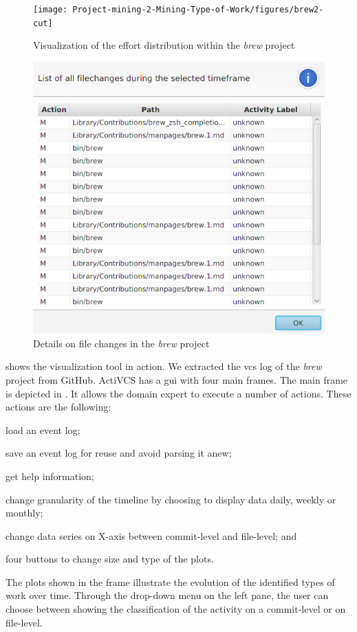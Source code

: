 \begin{figure}
    \centering
    \texttt{[image: Project-mining-2-Mining-Type-of-Work/figures/brew2-cut]}
    \caption{Visualization of the effort distribution within the \textsl{brew} project}
    \label{fig:brew2}
\end{figure}

\begin{figure}
    \centering
    \includegraphics[width=.7\textwidth]{Project-mining-2-Mining-Type-of-Work/figures/brew1-cut}
    \caption{Details on file changes in the \textsl{brew} project}
    \label{fig:brew1}
\end{figure}


 shows the visualization tool in action. We extracted the \gls{vcs} log of the \textsl{brew} project from GitHub. ActiVCS has a \gls{gui} with four main frames. The main frame is depicted in . It allows the domain expert to execute a number of actions. These actions are the following: \begin{inparaenum}[\itshape i)] 
\item load an event log; 
\item save an event log for reuse and avoid parsing it anew;
\item get help information;
\item change granularity of the timeline by choosing to display data daily, weekly or monthly; 
\item change data series on X-axis between commit-level and file-level; and
\item four buttons to change size and type of the plots.
\end{inparaenum}
The plots shown in the frame illustrate the evolution of the identified types of work over time. Through the drop-down menu on the left pane, the user can choose between showing the classification of the activity on a commit-level or on file-level.  

